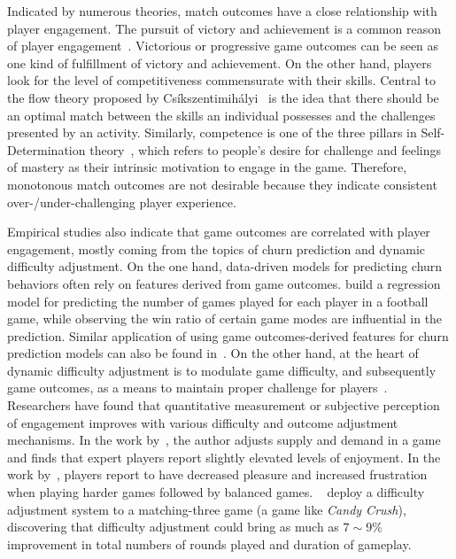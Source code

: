 Indicated by numerous theories, match outcomes have a close relationship with player engagement. The pursuit of victory and achievement is a common reason of player engagement~\cite{schoenau2011player,yee2006motivations,sherry2006video,wu2010falling,lazzaro2004we}. Victorious or progressive game outcomes can be seen as one kind of fulfillment of victory and achievement. On the other hand, players look for the level of competitiveness commensurate with their skills. Central to the flow theory proposed by Cs\'{i}kszentimih\'{a}lyi~\cite{sweetser2005gameflow,flow1990psychology,chen2007flow} is the idea that there should be an optimal match between the skills an individual possesses and the challenges presented by an activity. Similarly, competence is one of the three pillars in Self-Determination theory~\cite{przybylski2010motivational,ryan2006motivational}, which refers to people's desire for challenge and feelings of mastery as their intrinsic motivation to engage in the game. Therefore, monotonous match outcomes are not desirable because they indicate consistent over-/under-challenging player experience. 

Empirical studies also indicate that game outcomes are correlated with player engagement, mostly coming from the topics of churn prediction and dynamic difficulty adjustment. On the one hand, data-driven models for predicting churn behaviors often rely on features derived from game outcomes. \cite{weber2011using} build a regression model for predicting the number of games played for each player in a football game, while observing the win ratio of certain game modes are influential in the prediction. Similar application of using game outcomes-derived features for churn prediction models can also be found in~\cite{harrison2012players,xie2015predicting,}. On the other hand, at the heart of dynamic difficulty adjustment is to modulate game difficulty, and subsequently game outcomes, as a means to maintain proper challenge for players~\cite{hunicke2005case}. Researchers have found that quantitative measurement or subjective perception of engagement improves with various difficulty and outcome adjustment mechanisms. In the work by~\cite{hunicke2005case}, the author adjusts supply and demand in a game and finds that expert players report slightly elevated levels of enjoyment. In the work by~\cite{van2009incongruity}, players report to have decreased pleasure and increased frustration when playing harder games followed by balanced games. ~\cite{xue2017dynamic} deploy a difficulty adjustment system to a matching-three game (a game like \textit{Candy Crush}), discovering that difficulty adjustment could bring as much as $7 \sim 9 \%$ improvement in total numbers of rounds played and duration of gameplay.

